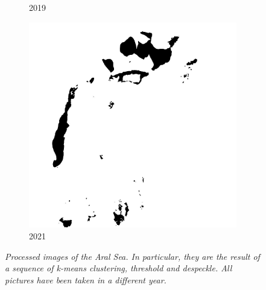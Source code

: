 \documentclass[12pt,a4paper]{article}
\begin{document}
\begin{figure}[H]
\begin{subfigure}[b]{0.19\textwidth}
        \caption{2019}
    \end{subfigure}
    \begin{subfigure}[b]{0.19\textwidth}
        \centering
        \includegraphics[width=\textwidth]{../img/2021w.jpg}
        \caption{2021}
    \end{subfigure}
    \caption{\emph{Processed images of the Aral Sea.
            In particular, they are the result of a sequence of k-means clustering, threshold and despeckle.
            All pictures have been taken in a different year.}}
    \label{fig:appendixsurface}
\end{figure}
\end{document}
